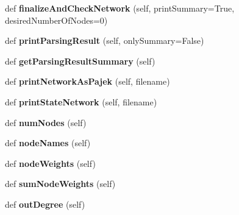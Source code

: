 \begin{DoxyCompactItemize}
def {\bfseries finalize\+And\+Check\+Network} (self, print\+Summary=True, desired\+Number\+Of\+Nodes=0)
\item 
\mbox{\label{classdsmacc_1_1graph_1_1infomap_1_1Network_ad5512d121fd536c8afa78d603e1c802e}} 
def {\bfseries print\+Parsing\+Result} (self, only\+Summary=False)
\item 
\mbox{\label{classdsmacc_1_1graph_1_1infomap_1_1Network_a088b74539624e1e0732a6103278447d4}} 
def {\bfseries get\+Parsing\+Result\+Summary} (self)
\item 
\mbox{\label{classdsmacc_1_1graph_1_1infomap_1_1Network_ac6d6573e5b9dd2d6fcddad772cb3b7dc}} 
def {\bfseries print\+Network\+As\+Pajek} (self, filename)
\item 
\mbox{\label{classdsmacc_1_1graph_1_1infomap_1_1Network_a2a1945263eba7e3abf440d69d73a7576}} 
def {\bfseries print\+State\+Network} (self, filename)
\item 
\mbox{\label{classdsmacc_1_1graph_1_1infomap_1_1Network_a883648479a64c17a40c88e2c5b36339e}} 
def {\bfseries num\+Nodes} (self)
\item 
\mbox{\label{classdsmacc_1_1graph_1_1infomap_1_1Network_a1938c8004a7c29520b2633f4d6fd0b97}} 
def {\bfseries node\+Names} (self)
\item 
\mbox{\label{classdsmacc_1_1graph_1_1infomap_1_1Network_a9c2443d828bf58c96683a231f326f1ee}} 
def {\bfseries node\+Weights} (self)
\item 
\mbox{\label{classdsmacc_1_1graph_1_1infomap_1_1Network_a83f3602797b4ba306ac30ec2b0aefd6e}} 
def {\bfseries sum\+Node\+Weights} (self)
\item 
\mbox{\label{classdsmacc_1_1graph_1_1infomap_1_1Network_a8d7f2592b5916cc48553ec5850707028}} 
def {\bfseries out\+Degree} (self)
\item 

\end{DoxyCompactItemize}
